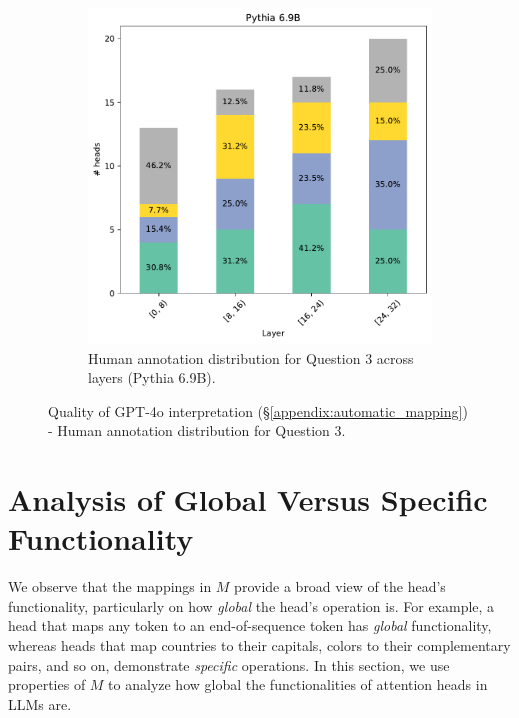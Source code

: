 \documentclass[11pt]{article}
\newcommand{\PythiaSevenB}{Pythia 6.9B}
\newcommand{\GPTFourO}{GPT-4o}
\begin{document}
\begin{figure}[htp]
    \begin{subfigure}{\columnwidth}
        \includegraphics[scale=0.45]
        {figures/human_validation/q3_by_layer_pythia}
        \caption{Human annotation distribution for Question 3 across layers (\PythiaSevenB{}).}
    \end{subfigure}
\caption{Quality of \GPTFourO{} interpretation (\S\ref{appendix:automatic_mapping}) - Human annotation distribution for Question 3.}
\label{fig:human_val_q3}
\end{figure}



\section{Analysis of Global Versus Specific Functionality}
\label{appendix:global_vs_local_appendix}


We observe that the mappings in $M$ provide a broad view of the head's functionality, particularly on how \emph{global} the head's operation is. For example, a head that maps any token to an end-of-sequence token has \textit{global} functionality, whereas heads that map countries to their capitals, colors to their complementary pairs, and so on, demonstrate \emph{specific} operations.
In this section, we use properties of $M$ to analyze how global the functionalities of attention heads in LLMs are.
\end{document}

